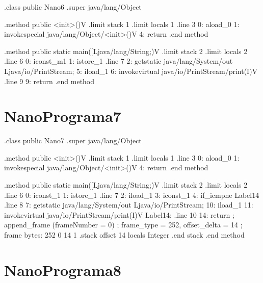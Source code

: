 \documentclass[12pt,a4paper,twoside]{report}
\begin{document}
\begin{terminal}
.class public Nano6
.super java/lang/Object

.method public <init>()V
  .limit stack 1
  .limit locals 1
  .line 3
  0: aload_0
  1: invokespecial java/lang/Object/<init>()V
  4: return
.end method

.method public static main([Ljava/lang/String;)V
  .limit stack 2
  .limit locals 2
  .line 6
  0: iconst_m1
  1: istore_1
  .line 7
  2: getstatic java/lang/System/out Ljava/io/PrintStream;
  5: iload_1
  6: invokevirtual java/io/PrintStream/print(I)V
  .line 9
  9: return
.end method
\end{terminal}\section{NanoPrograma7}
\begin{terminal}
.class public Nano7
.super java/lang/Object

.method public <init>()V
  .limit stack 1
  .limit locals 1
  .line 3
  0: aload_0
  1: invokespecial java/lang/Object/<init>()V
  4: return
.end method

.method public static main([Ljava/lang/String;)V
  .limit stack 2
  .limit locals 2
  .line 6
  0: iconst_1
  1: istore_1
  .line 7
  2: iload_1
  3: iconst_1
  4: if_icmpne Label14
  .line 8
  7: getstatic java/lang/System/out Ljava/io/PrintStream;
  10: iload_1
  11: invokevirtual java/io/PrintStream/print(I)V
Label14:
  .line 10
  14: return
  ; append_frame (frameNumber = 0)
  ; frame_type = 252, offset_delta = 14
  ; frame bytes: 252 0 14 1
  .stack
    offset 14
    locals Integer
    .end stack
.end method

\end{terminal}\section{NanoPrograma8}
\end{document}
